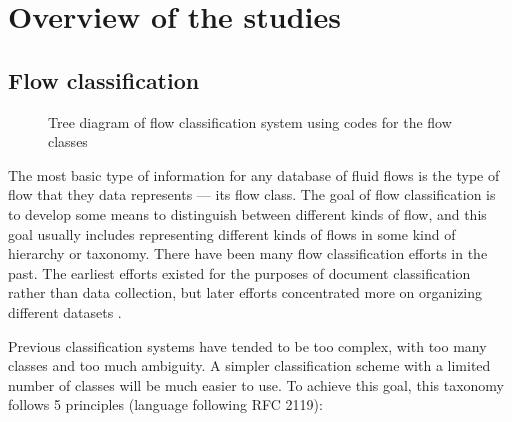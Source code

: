 %
\chapter{Overview of the studies}


\section{Flow classification}



\begin{figure}
    \centering
    
    \caption{Tree diagram of flow classification system using codes for the
    flow classes}
\end{figure}

The most basic type of information for any database of fluid flows is the type
of flow that they data represents --- its flow class.  The goal of flow
classification is to develop some means to distinguish between different kinds
of flow, and this goal usually includes representing different kinds of flows
in some kind of hierarchy or taxonomy.  There have been many flow
classification efforts in the past.  The earliest efforts existed for the
purposes of document classification \citep{ZWB+1944+deu+RPRT} rather than data
collection, but later efforts concentrated more on organizing different
datasets \citep{KlineSJ+1982+eng+BOOK+V3,ERCOFTAC+DBASE,AGARD+1998+eng+RPRT}.

Previous classification systems have tended to be too complex, with too many
classes and too much ambiguity.  A simpler classification scheme with a limited
number of classes will be much easier to use.  To achieve this goal, this
taxonomy follows 5 principles (language following RFC 2119):

